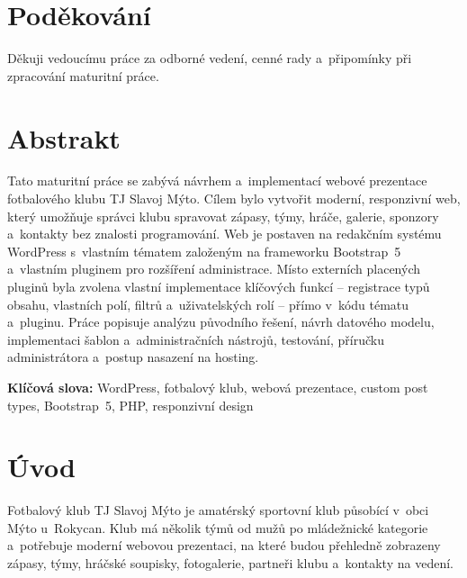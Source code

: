 \documentclass[12pt,a4paper]{article}
\begin{document}
\thispagestyle{empty}
\section*{Poděkování}

Děkuji vedoucímu práce za odborné vedení, cenné rady a~připomínky při zpracování maturitní práce.

\newpage

\thispagestyle{empty}
\section*{Abstrakt}

Tato maturitní práce se zabývá návrhem a~implementací webové prezentace fotbalového klubu TJ Slavoj Mýto. Cílem bylo vytvořit moderní, responzivní web, který umožňuje správci klubu spravovat zápasy, týmy, hráče, galerie, sponzory a~kontakty bez znalosti programování. Web je postaven na redakčním systému WordPress s~vlastním tématem založeným na frameworku Bootstrap~5 a~vlastním pluginem pro rozšíření administrace. Místo externích placených pluginů byla zvolena vlastní implementace klíčových funkcí -- registrace typů obsahu, vlastních polí, filtrů a~uživatelských rolí -- přímo v~kódu tématu a~pluginu. Práce popisuje analýzu původního řešení, návrh datového modelu, implementaci šablon a~administračních nástrojů, testování, příručku administrátora a~postup nasazení na hosting.

\textbf{Klíčová slova:} WordPress, fotbalový klub, webová prezentace, custom post types, Bootstrap~5, PHP, responzivní design

\newpage

\thispagestyle{empty}
\tableofcontents
\newpage

\clearpage
\section{Úvod}

Fotbalový klub TJ Slavoj Mýto je amatérský sportovní klub působící v~obci Mýto u~Rokycan. Klub má několik týmů od mužů po mládežnické kategorie a~potřebuje moderní webovou prezentaci, na které budou přehledně zobrazeny zápasy, týmy, hráčské soupisky, fotogalerie, partneři klubu a~kontakty na vedení.
\end{document}
